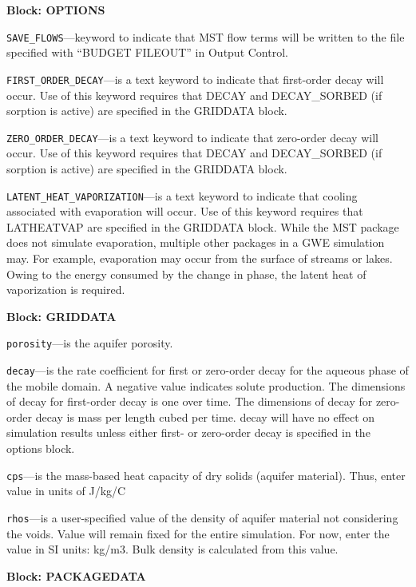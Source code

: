 
\item \textbf{Block: OPTIONS}

\begin{description}
\item \texttt{SAVE\_FLOWS}---keyword to indicate that MST flow terms will be written to the file specified with ``BUDGET FILEOUT'' in Output Control.

\item \texttt{FIRST\_ORDER\_DECAY}---is a text keyword to indicate that first-order decay will occur.  Use of this keyword requires that DECAY and DECAY\_SORBED (if sorption is active) are specified in the GRIDDATA block.

\item \texttt{ZERO\_ORDER\_DECAY}---is a text keyword to indicate that zero-order decay will occur.  Use of this keyword requires that DECAY and DECAY\_SORBED (if sorption is active) are specified in the GRIDDATA block.

\item \texttt{LATENT\_HEAT\_VAPORIZATION}---is a text keyword to indicate that cooling associated with evaporation will occur.  Use of this keyword requires that LATHEATVAP are specified in the GRIDDATA block.  While the MST package does not simulate evaporation, multiple other packages in a GWE simulation may.  For example, evaporation may occur from the surface of streams or lakes.  Owing to the energy consumed by the change in phase, the latent heat of vaporization is required.

\end{description}
\item \textbf{Block: GRIDDATA}

\begin{description}
\item \texttt{porosity}---is the aquifer porosity.

\item \texttt{decay}---is the rate coefficient for first or zero-order decay for the aqueous phase of the mobile domain.  A negative value indicates solute production.  The dimensions of decay for first-order decay is one over time.  The dimensions of decay for zero-order decay is mass per length cubed per time.  decay will have no effect on simulation results unless either first- or zero-order decay is specified in the options block.

\item \texttt{cps}---is the mass-based heat capacity of dry solids (aquifer material). Thus, enter value in units of J/kg/C

\item \texttt{rhos}---is a user-specified value of the density of aquifer material not considering the voids. Value will remain fixed for the entire simulation.  For now, enter the value in SI units: kg/m3.  Bulk density is calculated from this value.

\end{description}
\item \textbf{Block: PACKAGEDATA}

